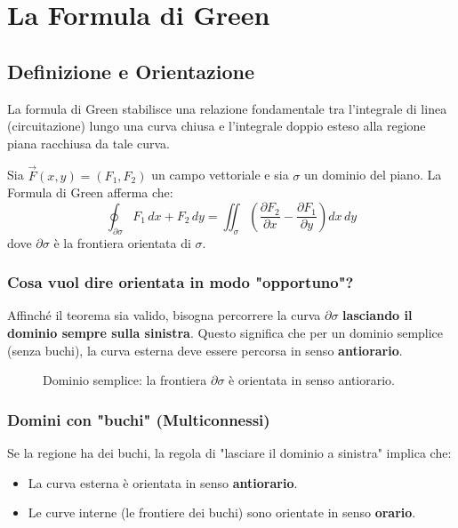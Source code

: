 \chapter{La Formula di Green}

\section{Definizione e Orientazione}
La formula di Green stabilisce una relazione fondamentale tra l'integrale di linea (circuitazione) lungo una curva chiusa e l'integrale doppio esteso alla regione piana racchiusa da tale curva.

Sia $\vec{F}(x,y) = (F_1, F_2)$ un campo vettoriale e sia $\sigma$ un dominio del piano. La Formula di Green afferma che:
\[
\oint_{\partial \sigma} F_1 \, dx + F_2 \, dy = \iint_{\sigma} \left( \frac{\partial F_2}{\partial x} - \frac{\partial F_1}{\partial y} \right) dx \, dy
\]
dove $\partial \sigma$ è la frontiera orientata di $\sigma$. 

\subsection{Cosa vuol dire orientata in modo "opportuno"?}
Affinché il teorema sia valido, bisogna percorrere la curva $\partial \sigma$ \textbf{lasciando il dominio sempre sulla sinistra}. 
Questo significa che per un dominio semplice (senza buchi), la curva esterna deve essere percorsa in senso \textbf{antiorario}.

\begin{figure}[H]
    \centering
    \caption{Dominio semplice: la frontiera $\partial \sigma$ è orientata in senso antiorario.}
\end{figure}

\subsection{Domini con "buchi" (Multiconnessi)}
Se la regione ha dei buchi, la regola di "lasciare il dominio a sinistra" implica che:
\begin{itemize}
    \item La curva esterna è orientata in senso \textbf{antiorario}.
    \item Le curve interne (le frontiere dei buchi) sono orientate in senso \textbf{orario}.
\end{itemize}

